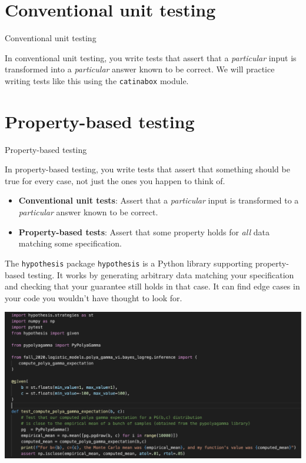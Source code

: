\documentclass[10pt]{beamer}
\begin{document}
\section{Conventional unit testing}
\begin{frame}{Conventional unit testing}

In \alert{conventional unit testing}, you write tests that assert that a \textit{particular} input is transformed into a \textit{particular} answer known to be correct.
\vfill 
We will practice writing tests like this using the \texttt{catinabox} module.
\end{frame}


\section{Property-based testing}


\begin{frame}{Property-based testing}

In \alert{property-based testing}, you write tests that assert that something should be true for every case, not just the ones you happen to think of.
\vfill 
\begin{itemize}
\item \textbf{Conventional unit tests}: Assert that a \textit{particular} input is transformed to a \textit{particular} answer known to be correct.
\item \textbf{Property-based tests}: Assert that some property holds for \textit{all} data matching some specification.
\end{itemize}
\vfill 
\pause 
{}
\begin{block}{The \texttt{hypothesis} package}
\texttt{hypothesis} is a Python library supporting property-based testing.
\vfill
It works by generating arbitrary data matching your specification and checking that your guarantee still holds in that case.
\vfill
It can find edge cases in your code you wouldn’t have thought to look for.
\end{block}
\end{frame}


\begin{frame}
\begin{center}
\includegraphics[width=\textwidth]{images/pypolyagamma_test}	
\end{center}
	
\end{frame}
\end{document}
